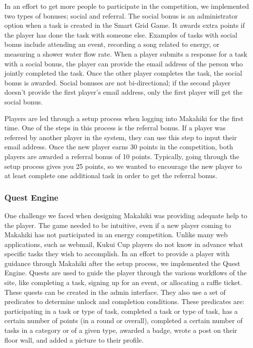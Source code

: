 \documentclass{acm_proc_article-sp}
\begin{document}
In an effort to get more people to participate in the competition, we implemented two types of bonuses; social and referral. The social bonus is an administrator option when a task is created in the Smart Grid Game. It awards extra points if the player has done the task with someone else. Examples of tasks with social bonus include attending an event, recording a song related to energy, or measuring a shower water flow rate. When a player submits a response for a task with a social bonus, the player can provide the email address of the person who jointly completed the task. Once the other player completes the task, the social bonus is awarded. Social bonuses are not bi-directional; if the second player doesn't provide the first player's email address, only the first player will get the social bonus.

Players are led through a setup process when logging into Makahiki for the first time. One of the steps in this process is the referral bonus. If a player was referred by another player in the system, they can use this step to input their email address. Once the new player earns 30 points in the competition, both players are awarded a referral bonus of 10 points. Typically, going through the setup process gives you 25 points, so we wanted to encourage the new player to at least complete one additional task in order to get the referral bonus.

\subsubsection{Quest Engine}

One challenge we faced when designing Makahiki was providing adequate help to the player. The game needed to be intuitive, even if a new player coming to Makahiki has not participated in an energy competition. Unlike many web applications, such as webmail, Kukui Cup players do not know in advance what specific tasks they wish to accomplish. In an effort to provide a player with guidance through Makahiki after the setup process, we implemented the Quest Engine. Quests are used to guide the player through the various workflows of the site, like completing a task, signing up for an event, or allocating a raffle ticket. These quests can be created in the admin interface. They also use a set of predicates to determine unlock and completion conditions. These predicates are: participating in a task or type of task, completed a task or type of task, has a certain number of points (in a round or overall), completed a certain number of tasks in a category or of a given type, awarded a badge, wrote a post on their floor wall, and added a picture to their profile.
\end{document}
